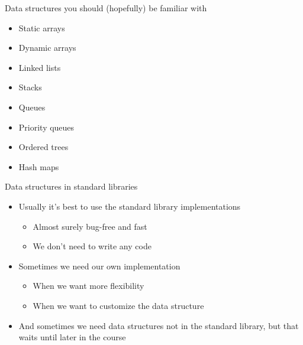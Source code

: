 \documentclass{beamer}
\begin{document}
\begin{frame}[plain]{Data structures you should (hopefully) be familiar with}
    \begin{itemize}
    \item Static arrays 
    \item Dynamic arrays 
    \item Linked lists 
    \item Stacks 
    \item Queues 
    \item Priority queues 
    \item Ordered trees 
    \item Hash maps 
    \end{itemize}
\end{frame}

\begin{frame}[plain]{Data structures in standard libraries}
    \begin{itemize}
        \item Usually it's best to use the standard library implementations
        \begin{itemize}
            \item Almost surely bug-free and fast
            \item We don't need to write any code
        \end{itemize}
        \item Sometimes we need our own implementation
        \begin{itemize}
            \item When we want more flexibility
            \item When we want to customize the data structure
        \end{itemize}
        \item And sometimes we need data structures not in the standard library, but that waits until later in the course
    \end{itemize}
\end{frame}
\end{document}
